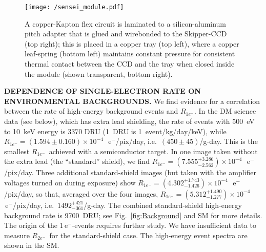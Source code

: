 \documentclass[aps,prl,twocolumn,showpacs,superscriptaddress,preprintnumbers]{revtex4-1}
\newcommand{\unit}[1]{\ensuremath{\mathrm{\,#1}}\xspace}
\newcommand{\e}{\unit{e^{-}}}
\newcommand{\Rs}{$R_{1e^-}$}
\newcommand{\Rtwo}{$R_{2e^-}$}
\begin{document}
\begin{figure}[t!]
\texttt{[image: /sensei\_module.pdf]}
\caption{A copper-Kapton flex circuit is laminated to a silicon-aluminum pitch adapter that is glued and wirebonded to the Skipper-CCD (top right); this is placed in a copper tray (top left), where a copper leaf-spring (bottom left) maintains constant pressure for consistent thermal contact between the CCD and the tray when closed inside the module (shown transparent, bottom right). 
\vspace{-4mm}
}
\label{fig:module}
\end{figure}

\noindent\textbf{DEPENDENCE OF SINGLE-ELECTRON RATE ON ENVIRONMENTAL BACKGROUNDS.}
We find evidence for a correlation between 
the rate of high-energy background events and \Rs.  In the DM science data (see below), which has extra lead shielding, the rate of events with 500~eV to 10~keV energy is 3370 DRU (1~DRU is 1~event/kg/day/keV), while $R_{1e^-}=(1.594 \pm 0.160)\times 10^{-4}$~\e/pix/day, i.e.~$(450\pm 45)$/g-day. This is the smallest \Rs\ achieved with a semiconductor target. In one image taken without the extra lead (the ``standard'' shield), we find $R_{1e^-}=(7.555^{+3.286}_{-2.562})\times 10^{-4}$~\e/pix/day. Three additional standard-shield images (but taken with the amplifier voltages turned on during exposure) show $R_{1e^-}=(4.302^{+1.743}_{-1.426})\times 10^{-4}$~\e/pix/day, so that, averaged over the four images,  $R_{1e^-}=(5.312^{+1.490}_{-1.277})\times 10^{-4}$~\e/pix/day, i.e.~$1492^{+421}_{-361}$/g-day.  The combined standard-shield high-energy background rate is 9700~DRU; see Fig.~\ref{fig:Background} and SM for more details. 
The origin of the 1\e-events requires further study. 
We have insufficient data to measure \Rtwo\ for the standard-shield case. The high-energy event spectra are shown in the SM. 
\end{document}
